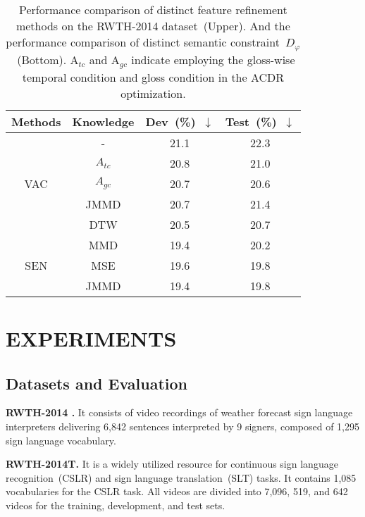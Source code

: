 \documentclass[sigconf]{acmart}
\begin{document}
\setlength{\tabcolsep}{9pt}
\begin{table}[!htbp]
\centering
\fontsize{9}{12}\selectfont
\caption{Performance comparison of distinct feature refinement methods on the {RWTH-2014} dataset~(Upper).
And the performance comparison of distinct semantic constraint~$D_\varphi$~(Bottom). {A}$_{tc}$ and {A}$_{gc}$ indicate employing the gloss-wise temporal condition and gloss condition in the ACDR optimization.}
\begin{tabular}{c|c|c|c} 
\toprule
Methods & Knowledge & Dev~(\%)~$\downarrow$ & Test~(\%)~$\downarrow$ \\ \midrule \multirow{5}{*}{VAC} & - & 21.1 & 22.3 \\ ~ & $A_{tc}$ & 20.8 & 21.0 \\\cmidrule{2-4} ~ & $A_{gc}$ & 20.7 & 20.6 \\ ~ & JMMD & 20.7 & 21.4 \\ ~ & DTW & 20.5 & 20.7 \\ \midrule \multirow{3}{*}{SEN} & MMD & 19.4 & 20.2 \\ ~ & MSE & 19.6 & 19.8 \\ ~ & JMMD & 19.4 & 19.8 \\ \bottomrule
    \end{tabular}
    \label{Table:abl_konwledge}
\end{table}











\section{EXPERIMENTS}
\subsection{Datasets and Evaluation}
\label{sec_Data_implement}
\noindent\textbf{RWTH-2014 \cite{koller2015continuous}.} It consists of video recordings of weather forecast sign language interpreters delivering 6,842 sentences interpreted by 9 signers, composed of 1,295 sign language vocabulary.


\noindent\textbf{RWTH-2014T\cite{camgoz2018neural}.} It is a widely utilized resource for continuous sign language recognition~(CSLR) and sign language translation~(SLT) tasks. It contains 1,085 vocabularies for the CSLR task. All videos are divided into 7,096, 519, and 642 videos for the training, development, and test sets.
\end{document}

